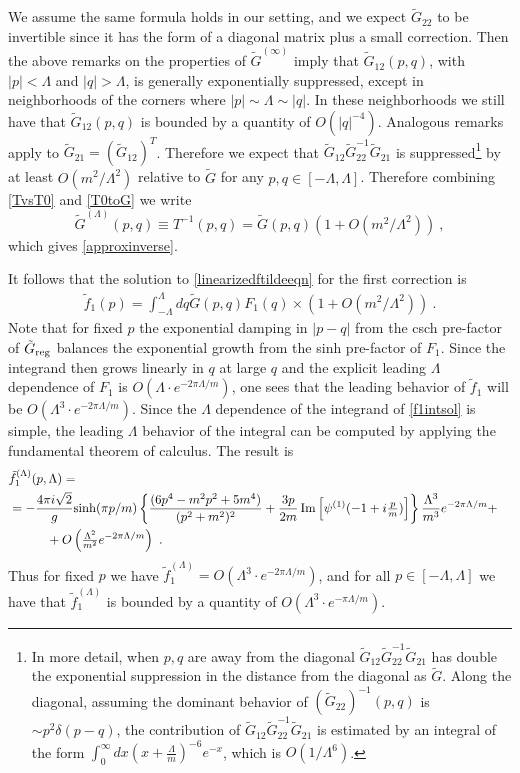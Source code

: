 \def\letter{0}\def\pr{0}\documentclass[a4paper,12pt, epsfig]{article}
\renewcommand{\sinh}{\textrm{sinh}}
\renewcommand{\(}{\begin{equation}}
\renewcommand{\)}{end{equation} \vspace{-.05in}\linebreak}
\renewcommand{\=}{\hspace{-.03in}=\hspace{-.02in}}
\renewcommand{\(}{\begin{equation}}
\renewcommand{\)}{\end{equation}}
\renewcommand{\(}{\begin{equation}}
\renewcommand{\)}{\end{equation}}
\begin{document}
We assume the same formula holds in our setting, and we expect $\tilde{G}_{22}$ to be invertible since it has the form of a diagonal matrix plus a small correction.  Then the above remarks on the properties of $\tilde{G}^{(\infty)}$ imply that $\tilde{G}_{12}(p,q)$, with $|p| < \Lambda$ and $|q| > \Lambda$, is generally exponentially suppressed, except in neighborhoods of the corners where $|p| \sim \Lambda \sim |q|$.  In these neighborhoods we still have that $\tilde{G}_{12}(p,q)$ is bounded by a quantity of $O(|q|^{-4})$.  Analogous remarks apply to $\tilde{G}_{21} = (\tilde{G}_{12})^T$.  Therefore we expect that $\tilde{G}_{12} \tilde{G}_{22}^{-1} \tilde{G}_{21}$ is suppressed\footnote{In more detail, when $p,q$ are away from the diagonal $\tilde{G}_{12} \tilde{G}_{22}^{-1} \tilde{G}_{21}$ has double the exponential suppression in the distance from the diagonal as $\tilde{G}$.  Along the diagonal, assuming the dominant behavior of $(\tilde{G}_{22})^{-1}(p,q)$ is $\sim p^2 \delta(p-q)$, the contribution of $\tilde{G}_{12} \tilde{G}_{22}^{-1} \tilde{G}_{21}$ is estimated by an integral of the form $\int_{0}^{\infty} dx (x + \frac{\Lambda}{m})^{-6} e^{-x}$, which is $O(1/\Lambda^6)$.} by at least $O(m^2/\Lambda^2)$ relative to $\tilde{G}$ for any $p,q \in [-\Lambda,\Lambda]$.  Therefore combining \eqref{TvsT0} and \eqref{T0toG} we write
%
\begin{equation}
\tilde{G}^{(\Lambda)}(p,q) \equiv T^{-1}(p,q) = \tilde{G}(p,q) \left( 1 + O(m^2/\Lambda^2) \right)~,
\end{equation}
%
which gives \eqref{approxinverse}.

It follows that the solution to \eqref{linearizedftildeeqn} for the first correction is
%
\begin{align}\label{f1intsol}
\tilde{f}_1(p) = \int_{-\Lambda}^{\Lambda} dq \tilde{G}(p,q) F_1(q) \times (1 + O(m^2/\Lambda^2)) ~.
\end{align}
%
Note that for fixed $p$ the exponential damping in $|p-q|$ from the csch pre-factor of $\tilde{G}_{\rm reg}$ balances the exponential growth from the sinh pre-factor of $F_1$.  Since the integrand then grows linearly in $q$ at large $q$ and the explicit leading $\Lambda$ dependence of $F_1$ is $O(\Lambda \cdot e^{-2\pi \Lambda/m})$, one sees that the leading behavior of $\tilde{f}_1$ will be $O(\Lambda^3 \cdot e^{-2\pi \Lambda/m})$.  Since the $\Lambda$ dependence of the integrand of \eqref{f1intsol} is simple, the leading $\Lambda$ behavior of the integral can be computed by applying the fundamental theorem of calculus.  The result is
%
\begin{align}
& \tilde{f}_{1}^{(\Lambda)}(p,\Lambda) = \cr
&=  - \frac{4\pi i \sqrt{2}}{g} \sinh(\pi p/m) \left\{ \frac{ (6 p^4 - m^2 p^2 + 5 m^4)}{(p^2 + m^2)^2} + \frac{3 p}{2m} \operatorname{Im}\left[ \psi^{(1)}(-1+i \tfrac{p}{m}) \right] \right\} \frac{\Lambda^3}{m^3} e^{-2\pi \Lambda/m}  + \cr
& \qquad \quad + O\left( \tfrac{\Lambda^2}{m^2} e^{-2\pi \Lambda/m}\right) ~. \label{finale}
\end{align}
%
Thus for fixed $p$ we have $\tilde{f}_{1}^{(\Lambda)}= O(\Lambda^3 \cdot e^{-2\pi \Lambda/m})$, and for all $p \in [-\Lambda, \Lambda]$ we have that $\tilde{f}_{1}^{(\Lambda)}$ is bounded by a quantity of $O(\Lambda^3 \cdot e^{-\pi \Lambda/m})$.
\end{document}
